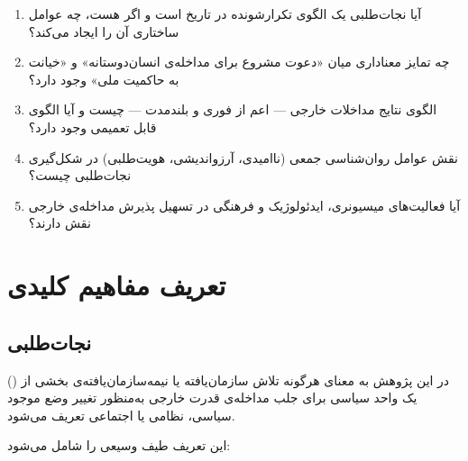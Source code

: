 \begin{tcolorbox}[defbox, title={پرسش‌های محوری پژوهش}]
\begin{enumerate}[nosep, label=\textbf{پ\arabic*}.]
  \item آیا نجات‌طلبی یک الگوی تکرارشونده در تاریخ است و اگر هست، چه عوامل ساختاری آن را ایجاد می‌کند؟
  \item چه تمایز معناداری میان «دعوت مشروع برای مداخله‌ی انسان‌دوستانه» و «خیانت به حاکمیت ملی» وجود دارد؟
  \item الگوی نتایج مداخلات خارجی — اعم از فوری و بلندمدت — چیست و آیا الگوی قابل تعمیمی وجود دارد؟
  \item نقش عوامل روان‌شناسی جمعی (ناامیدی، آرزواندیشی، هویت‌طلبی) در شکل‌گیری نجات‌طلبی چیست؟
  \item آیا فعالیت‌های میسیونری، ایدئولوژیک و فرهنگی در تسهیل پذیرش مداخله‌ی خارجی نقش دارند؟
\end{enumerate}
\end{tcolorbox}

\section{تعریف مفاهیم کلیدی}
\label{sec:ch01-definitions}

\subsection{نجات‌طلبی}
\label{subsec:ch01-def-salvation}

 () در این پژوهش به معنای هرگونه تلاش سازمان‌یافته یا نیمه‌سازمان‌یافته‌ی بخشی از یک واحد سیاسی برای جلب مداخله‌ی قدرت خارجی به‌منظور تغییر وضع موجود سیاسی، نظامی یا اجتماعی تعریف می‌شود.

این تعریف طیف وسیعی را شامل می‌شود:

